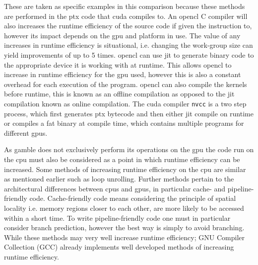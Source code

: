 These are taken as specific examples in this comparison because these methods are performed in the \acrfull{ptx} code that \gls{cuda} compiles to.
An \gls{opencl} C compiler will also increases the runtime efficiency of the source code if given the instruction to, however its impact depends on the \acrshort{gpu} and platform in use.
The value of any increases in runtime efficiency is situational, i.e. changing the work-group size can yield improvements of up to 5 times. \citep{ocl_lecture3}
\gls{opencl} can use \acrshort{jit} to generate binary code to the appropriate device it is working with at runtime.
This allows \gls{opencl} to increase in runtime efficiency for the \acrshort{gpu} used, however this is also a constant overhead for each execution of the program. 
\gls{opencl} can also compile the kernels before runtime, this is known as an offline compilation as opposed to the \acrshort{jit} compilation known as online compilation. 
The \gls{cuda} compiler \texttt{nvcc} is a two step process, which first generates \acrshort{ptx} bytecode and then either \acrshort{jit} compile on runtime or compiles a fat binary at compile time, which contains multiple programs for different \acrshort{gpu}s. \citep{nvidia_cude_fat_bin}

As \gls{gamble} does not exclusively perform its operations on the \acrshort{gpu} the code run on the \acrshort{cpu} must also be considered as a point in which runtime efficiency can be increased.
Some methods of increasing runtime efficiency on the \acrshort{cpu} are similar as mentioned earlier such as loop unrolling.
Further methods pertain to the architectural differences between \acrshort{cpu}s and \acrshort{gpu}s, in particular cache- and pipeline-friendly code.
Cache-friendly code means considering the principle of spatial locality i.e. memory regions closer to each other, are more likely to be accessed within a short time.
To write pipeline-friendly code one must in particular consider branch prediction, however the best way is simply to avoid branching. \citep{CCodeOpt}
While these methods may very well increase runtime efficiency; GNU Compiler Collection (GCC) already implements well developed methods of increasing runtime efficiency.